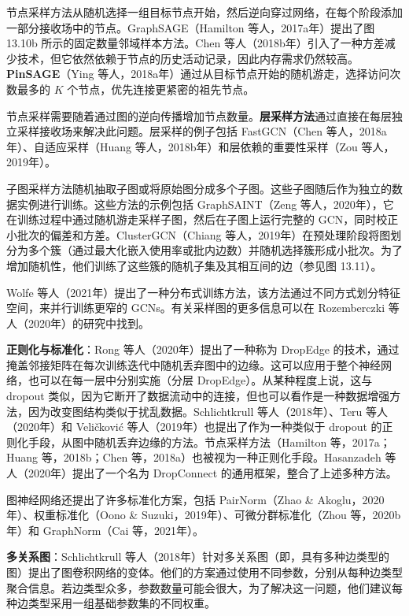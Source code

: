 节点采样方法从随机选择一组目标节点开始，然后逆向穿过网络，在每个阶段添加一部分接收场中的节点。GraphSAGE（Hamilton 等人，2017a年）提出了图 13.10b 所示的固定数量邻域样本方法。Chen 等人（2018b年）引入了一种方差减少技术，但它依然依赖于节点的历史活动记录，因此内存需求仍然较高。\textbf{PinSAGE}（Ying 等人，2018a年）通过从目标节点开始的随机游走，选择访问次数最多的 \(K\) 个节点，优先连接更紧密的祖先节点。

节点采样需要随着通过图的逆向传播增加节点数量。\textbf{层采样方法}通过直接在每层独立采样接收场来解决此问题。层采样的例子包括 FastGCN（Chen 等人，2018a年）、自适应采样（Huang 等人，2018b年）和层依赖的重要性采样（Zou 等人，2019年）。

子图采样方法随机抽取子图或将原始图分成多个子图。这些子图随后作为独立的数据实例进行训练。这些方法的示例包括 GraphSAINT（Zeng 等人，2020年），它在训练过程中通过随机游走采样子图，然后在子图上运行完整的 GCN，同时校正小批次的偏差和方差。ClusterGCN（Chiang 等人，2019年）在预处理阶段将图划分为多个簇（通过最大化嵌入使用率或批内边数）并随机选择簇形成小批次。为了增加随机性，他们训练了这些簇的随机子集及其相互间的边（参见图 13.11）。

Wolfe 等人（2021年）提出了一种分布式训练方法，该方法通过不同方式划分特征空间，来并行训练更窄的 GCNs。有关采样图的更多信息可以在 Rozemberczki 等人（2020年）的研究中找到。

\textbf{正则化与标准化}：Rong 等人（2020年）提出了一种称为 DropEdge 的技术，通过掩盖邻接矩阵在每次训练迭代中随机丢弃图中的边缘。这可以应用于整个神经网络，也可以在每一层中分别实施（分层 DropEdge）。从某种程度上说，这与 dropout 类似，因为它断开了数据流动中的连接，但也可以看作是一种数据增强方法，因为改变图结构类似于扰乱数据。Schlichtkrull 等人（2018年）、Teru 等人（2020年）和 Veličković 等人（2019年）也提出了作为一种类似于 dropout 的正则化手段，从图中随机丢弃边缘的方法。节点采样方法（Hamilton 等，2017a；Huang 等，2018b；Chen 等，2018a）也被视为一种正则化手段。Hasanzadeh 等人（2020年）提出了一个名为 DropConnect 的通用框架，整合了上述多种方法。

图神经网络还提出了许多标准化方案，包括 PairNorm（Zhao \& Akoglu，2020年）、权重标准化（Oono \& Suzuki，2019年）、可微分群标准化（Zhou 等，2020b年）和 GraphNorm（Cai 等，2021年）。

\textbf{多关系图}：Schlichtkrull 等人（2018年）针对多关系图（即，具有多种边类型的图）提出了图卷积网络的变体。他们的方案通过使用不同参数，分别从每种边类型聚合信息。若边类型众多，参数数量可能会很大，为了解决这一问题，他们建议每种边类型采用一组基础参数集的不同权重。

